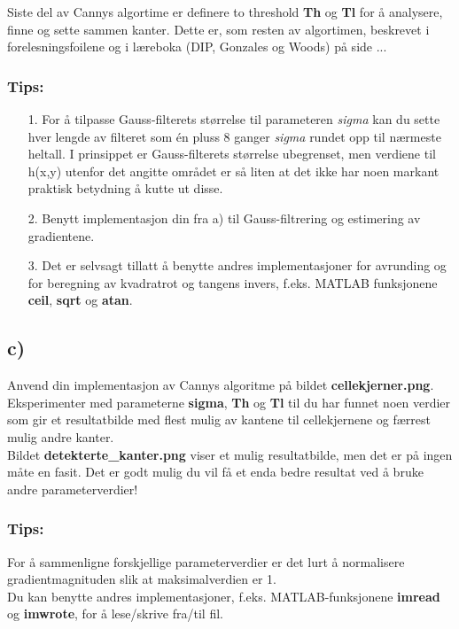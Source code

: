\documentclass[11pt,a4paper]{article}
\begin{document}
Siste del av Cannys algortime er definere to threshold \textbf{Th} og \textbf{Tl} for å 
analysere, finne og sette sammen kanter. Dette er, som resten av algortimen, beskrevet i 
forelesningsfoilene og i læreboka (DIP, Gonzales og Woods) på side ...

\subsubsection*{Tips:}
\begin{itemize}
\item[1.] For å tilpasse Gauss-filterets størrelse til parameteren \textit{sigma} kan du sette
hver lengde av filteret som én pluss 8 ganger \textit{sigma} rundet opp til
nærmeste heltall. I prinsippet er Gauss-filterets størrelse ubegrenset, men
verdiene til h(x,y) utenfor det angitte området er så liten at det ikke har
noen markant praktisk betydning å kutte ut disse.
\item[2.] Benytt implementasjon din fra a) til Gauss-filtrering og estimering av
gradientene.
\item[3.] Det er selvsagt tillatt å benytte andres implementasjoner for avrunding
og for beregning av kvadratrot og tangens invers, f.eks. MATLAB funksjonene
\textbf{ceil}, \textbf{sqrt} og \textbf{atan}.
\end{itemize}

\subsection*{c)}
Anvend din implementasjon av Cannys algoritme på bildet \textbf{cellekjerner.png}.
Eksperimenter med parameterne \textbf{sigma}, \textbf{Th} og \textbf{Tl} til du har funnet noen
verdier som gir et resultatbilde med flest mulig av kantene til cellekjernene og
færrest mulig andre kanter.
\\

Bildet \textbf{detekterte\_kanter.png} viser et mulig resultatbilde, 
men det er på ingen måte en fasit. Det er godt mulig du vil få et enda bedre resultat ved å bruke
andre parameterverdier!


\subsubsection*{Tips:} For å sammenligne forskjellige parameterverdier er det lurt å
normalisere gradientmagnituden slik at maksimalverdien er 1.
\\

Du kan benytte andres implementasjoner, f.eks. MATLAB-funksjonene \textbf{imread} og
\textbf{imwrote}, for å lese/skrive fra/til fil.
\end{document}
